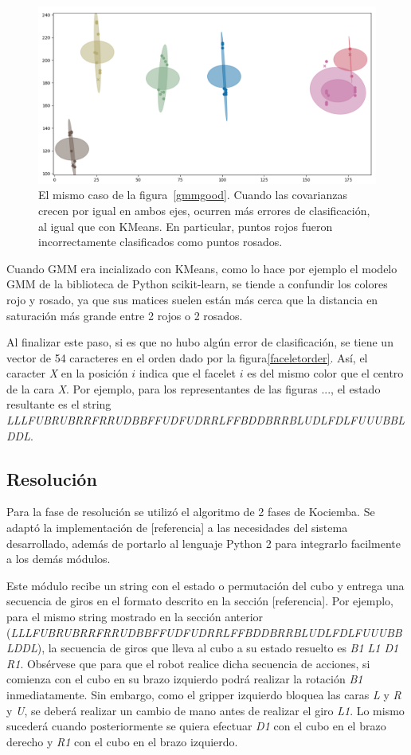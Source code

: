 \begin{figure}[h!]
	\centering
	\includegraphics[width=\textwidth]{figures/gmm_bad}
	\caption{El mismo caso de la figura~\ref{gmmgood}. Cuando las covarianzas crecen por igual en ambos ejes, ocurren más errores de clasificación, al igual que con KMeans. En particular, puntos rojos fueron incorrectamente clasificados como puntos rosados.}
	\label{gmmbad}
\end{figure}

Cuando GMM era incializado con KMeans, como lo hace por ejemplo el modelo GMM de la biblioteca de Python scikit-learn, se tiende a confundir los colores rojo y rosado, ya que sus matices suelen están más cerca que la distancia en saturación más grande entre 2 rojos o 2 rosados.

Al finalizar este paso, si es que no hubo algún error de clasificación, se tiene un vector de 54 caracteres en el orden dado por la figura\ref{faceletorder}. Así, el caracter \textit{X} en la posición $i$ indica que el facelet $i$ es del mismo color que el centro de la cara \textit{X}. Por ejemplo, para los representantes de las figuras ..., el estado resultante es el string \textit{LLLFUBRUBRRFRRUDBBFFUDFUDRRLFFBDDBRRBLUDLFDLFUUUBBLDDL}.


\subsection{Resolución}
Para la fase de resolución se utilizó el algoritmo de 2 fases de Kociemba. Se adaptó la implementación de [referencia] a las necesidades del sistema desarrollado, además de portarlo al lenguaje Python 2 para integrarlo facilmente a los demás módulos.

Este módulo recibe un string con el estado o permutación del cubo y entrega una secuencia de giros en el formato descrito en la sección [referencia]. Por ejemplo, para el mismo string mostrado en la sección anterior (\textit{LLLFUBRUBRRFRRUDBBFFUDFUDRRLFFBDDBRRBLUDLFDLFUUUBBLDDL}), la secuencia de giros que lleva al cubo a su estado resuelto es \textit{B1 L1 D1 R1}. Obsérvese que para que el robot realice dicha secuencia de acciones, si comienza con el cubo en su brazo izquierdo podrá realizar la rotación \textit{B1} inmediatamente. Sin embargo, como el gripper izquierdo bloquea las caras \textit{L} y \textit{R} y \textit{U}, se deberá realizar un cambio de mano antes de realizar el giro \textit{L1}. Lo mismo sucederá cuando posteriormente se quiera efectuar \textit{D1} con el cubo en el brazo derecho y \textit{R1} con el cubo en el brazo izquierdo.


